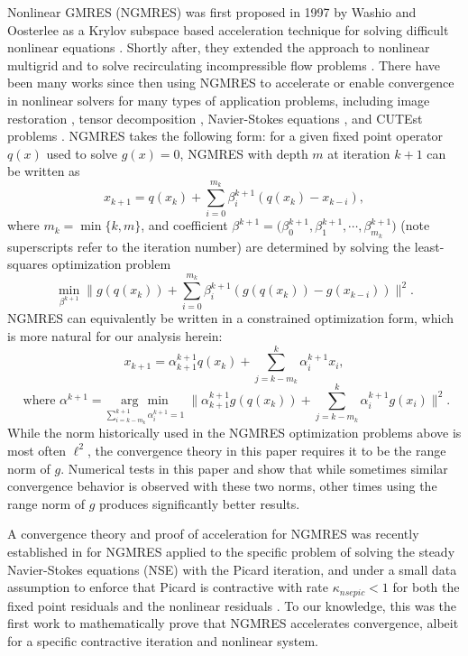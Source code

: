 \documentclass{article}
\numberwithin{equation}{section}
\newcommand{\argmin}[1]{\underset{#1}{\operatorname{arg}\,\operatorname{min}}\;}
\begin{document}
Nonlinear GMRES (NGMRES) was first proposed in 1997 by Washio and Oosterlee as 
a Krylov subspace based acceleration technique for solving difficult nonlinear equations \cite{washio1997krylov}.  Shortly after, they extended the approach to nonlinear multigrid and to solve recirculating incompressible flow problems  \cite{oosterlee2000krylov}.  There have been many works since then using NGMRES to accelerate or enable convergence in nonlinear solvers for many types of application problems, including image restoration \cite{chang2003acceleration,savage2005improved,he2025generalized}, tensor decomposition 
\cite{sterck2012nonlinear, sterck2013steepest, sterck2021asymptotic}, Navier-Stokes equations \cite{HR26}, and CUTEst problems \cite{riseth2019objective}.  NGMRES takes the following form:  for a given fixed point operator $q(x)$ used to solve $g(x)=0$, NGMRES with depth $m$ at iteration $k+1$ can be written as 
\begin{equation}
 				x_{k+1} = q(x_k) + \sum_{i=0}^{m_k}\beta_i^{k+1} \left(q(x_k)- x_{k-i} \right), \label{eq:min-NG1} 
\end{equation}
where $m_k=\min\{k,m\}$, and coefficient $\beta^{k+1}=\big(\beta_0^{k+1},\beta_1^{k+1},\cdots, \beta_{m_k}^{k+1}\big)$ (note superscripts refer to the iteration number) are determined by solving the  least-squares optimization problem
 \begin{equation}\label{eq:min-NG2} 
 				\min_{\beta^{k+1}} \| g(q(x_k))+\sum_{i=0}^{m_k} \beta_i^{k+1} \left(g(q(x_k))-g(x_{k-i}) \right)\|^2.
 \end{equation}
NGMRES can equivalently be written in a constrained optimization form, which is more natural for our analysis herein:
\[
 				x_{k+1} = \alpha^{k+1}_{k+1} q(x_k) + \sum_{j=k-m_k}^k \alpha^{k+1}_i x_i,
\]
\[
\mbox{ where }
 				\alpha^{k+1} = \argmin{\sum_{i=k-m_k}^{k+1} \alpha_i^{k+1} = 1} 
				\| \alpha^{k+1}_{k+1} g(q(x_k))+ \sum_{j=k-m_k}^k \alpha^{k+1}_i g(x_i) \|^2.
\]
While the norm historically used in the NGMRES optimization problems above is most often $\ell^2$, the convergence theory in this paper requires it to be the range norm of $g$.  Numerical tests in this paper and \cite{HR26} show that while sometimes similar convergence behavior is observed with these two norms, other times using the range norm of $g$ produces significantly better results.

A convergence theory and proof of acceleration for NGMRES was recently established in \cite{HR26} for NGMRES applied to the specific problem of solving the steady Navier-Stokes equations (NSE) with the Picard iteration, and under a small data assumption 
to enforce that Picard is contractive with rate $\kappa_{nsepic}<1$ for both the fixed point residuals and the nonlinear residuals \cite{HR26}.  To our knowledge, this was the first work to mathematically prove that NGMRES accelerates convergence, albeit for a specific contractive iteration and nonlinear system.
\end{document}
